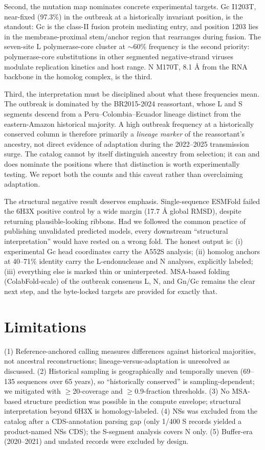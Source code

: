\documentclass[12pt]{article}
\begin{document}
Second, the mutation map nominates concrete experimental targets. Gc I1203T, near-fixed (97.3\%) in the outbreak at a historically invariant position, is the standout: Gc is the class-II fusion protein mediating entry, and position 1203 lies in the membrane-proximal stem/anchor region that rearranges during fusion. The seven-site L polymerase-core cluster at $\sim$60\% frequency is the second priority: polymerase-core substitutions in other segmented negative-strand viruses modulate replication kinetics and host range. N M170T, 8.1 \AA{} from the RNA backbone in the homolog complex, is the third.

Third, the interpretation must be disciplined about what these frequencies mean. The outbreak is dominated by the BR2015-2024 reassortant, whose L and S segments descend from a Peru--Colombia--Ecuador lineage distinct from the eastern-Amazon historical majority. A high outbreak frequency at a historically conserved column is therefore primarily a \emph{lineage marker} of the reassortant's ancestry, not direct evidence of adaptation during the 2022--2025 transmission surge. The catalog cannot by itself distinguish ancestry from selection; it can and does nominate the positions where that distinction is worth experimentally testing. We report both the counts and this caveat rather than overclaiming adaptation.

The structural negative result deserves emphasis. Single-sequence ESMFold failed the 6H3X positive control by a wide margin (17.7 \AA{} global RMSD), despite returning plausible-looking ribbons. Had we followed the common practice of publishing unvalidated predicted models, every downstream ``structural interpretation'' would have rested on a wrong fold. The honest output is: (i) experimental Gc head coordinates carry the A552S analysis; (ii) homolog anchors at 40--71\% identity carry the L-endonuclease and N analyses, explicitly labeled; (iii) everything else is marked thin or uninterpreted. MSA-based folding (ColabFold-scale) of the outbreak consensus L, N, and Gn/Gc remains the clear next step, and the byte-locked targets are provided for exactly that.

\section{Limitations}
(1) Reference-anchored calling measures differences against historical majorities, not ancestral reconstructions; lineage-versus-adaptation is unresolved as discussed. (2) Historical sampling is geographically and temporally uneven (69--135 sequences over 65 years), so ``historically conserved'' is sampling-dependent; we mitigated with $\geq$20-coverage and $\geq$0.9-fraction thresholds. (3) No MSA-based structure prediction was possible in the compute envelope; structural interpretation beyond 6H3X is homology-labeled. (4) NSs was excluded from the catalog after a CDS-annotation parsing gap (only 1/400 S records yielded a product-named NSs CDS); the S-segment analysis covers N only. (5) Buffer-era (2020--2021) and undated records were excluded by design.
\end{document}
